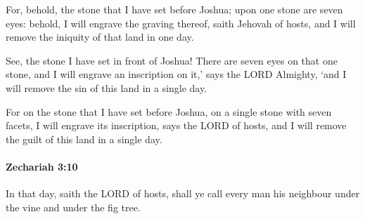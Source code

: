 			\begin{versebox}
					\item[BHS] 
					\item[LXX] 
					\item[ASV] For, behold, the stone that I have set before Joshua; upon one stone are seven eyes: behold, I will engrave the graving thereof, saith Jehovah of hosts, and I will remove the iniquity of that land in one day.
					\item[NIV] See, the stone I have set in front of Joshua! There are seven eyes on that one stone, and I will engrave an inscription on it,’ says the LORD Almighty, ‘and I will remove the sin of this land in a single day.
					\item[NRSV] For on the stone that I have set before Joshua, on a single stone with seven facets, I will engrave its inscription, says the LORD of hosts, and I will remove the guilt of this land in a single day.
			\end{versebox}

		\paragraph{Zechariah 3:10} %
			\label{ZECHARIAH-3-10}

			In that day, saith the LORD of hosts, shall ye call every man his neighbour under the vine and under the fig tree.

